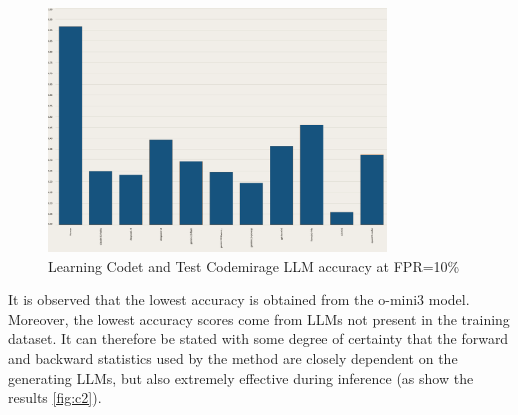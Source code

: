 \begin{figure}[H]
    \centering
    \includegraphics[width=0.8\textwidth]{img/TEST/BiScope/fromCodetCodemirange/accuracy LLM (2).png}
    \caption{Learning Codet and Test Codemirage LLM accuracy at FPR=10\%}
    \label{fig:3}
\end{figure}

It is observed that the lowest accuracy is obtained from the o-mini3 model. 
Moreover, the lowest accuracy scores come from LLMs not present in the 
training dataset. It can therefore be stated with some degree of certainty 
that the forward and backward statistics used by the method are closely 
dependent on the generating LLMs, but also extremely effective during 
inference (as show the results \ref{fig:c2}).

